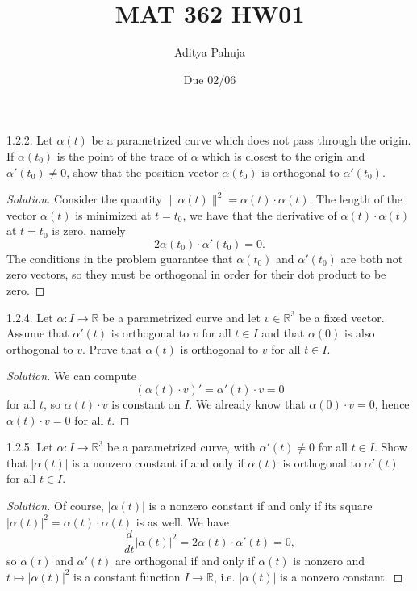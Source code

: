 \documentclass[11pt]{scrartcl}
\title{\vspace{-2em}MAT 362 HW01}
\author{\large Aditya Pahuja}
\date{\large Due 02/06}
\providecommand{\RR}{\mathbb R}
\newenvironment{soln}{\begin{proof}[Solution]}{\end{proof}}
\begin{document}
\maketitle

\begin{problem*}1.2.2.
	Let $\alpha(t)$ be a parametrized curve which
	does not pass through the origin. If $\alpha(t_0)$ is the point
	of the trace of $\alpha$ which is closest to the origin
	and $\alpha'(t_0)\ne 0$, show that
	the position vector $\alpha(t_0)$ is orthogonal to $\alpha'(t_0)$.
\end{problem*}

\begin{soln}
	Consider the quantity $\|\alpha(t)\|^2 = \alpha(t)\cdot\alpha(t)$.
	The length of the vector $\alpha(t)$ is minimized at $t=t_0$,
	we have that the derivative of $\alpha(t)\cdot\alpha(t)$
	at $t=t_0$ is zero, namely
	\[2\alpha(t_0)\cdot\alpha'(t_0) = 0.\]
	The conditions in the problem guarantee that $\alpha(t_0)$
	and $\alpha'(t_0)$ are both not zero vectors, so they must be orthogonal
	in order for their dot product to be zero.
\end{soln}

\begin{problem*}1.2.4.
	Let $\alpha\colon I\to\RR$ be a parametrized curve
	and let $v\in\RR^3$ be a fixed vector. Assume that $\alpha'(t)$
	is orthogonal to $v$ for all $t\in I$ and that $\alpha(0)$
	is also orthogonal to $v$. Prove that $\alpha(t)$ is orthogonal to $v$
	for all $t\in I$.
\end{problem*}

\begin{soln}
	We can compute
	\[(\alpha(t)\cdot v)' = \alpha'(t)\cdot v = 0\]
	for all $t$, so $\alpha(t)\cdot v$ is constant on $I$.
	We already know that $\alpha(0)\cdot v = 0$,
	hence $\alpha(t)\cdot v = 0$ for all $t$.
\end{soln}

\begin{problem*}1.2.5.
	Let $\alpha\colon I\to\RR^3$ be a parametrized curve,
	with $\alpha'(t)\ne 0$ for all $t\in I$. Show that
	$|\alpha(t)|$ is a nonzero constant if and only if
	$\alpha(t)$ is orthogonal to $\alpha'(t)$ for all $t\in I$.
\end{problem*}

\begin{soln}
	Of course, $|\alpha(t)|$ is a nonzero constant if and only if its square
	$|\alpha(t)|^2 = \alpha(t)\cdot\alpha(t)$ is as well. We have
	\[\frac{d}{dt}|\alpha(t)|^2 = 2\alpha(t)\cdot\alpha'(t) = 0,\]
	so $\alpha(t)$ and $\alpha'(t)$ are orthogonal if and only if
	$\alpha(t)$ is nonzero and $t\mapsto |\alpha(t)|^2$ is a constant function
	$I\to\RR$, i.e. $|\alpha(t)|$ is a nonzero constant.
\end{soln}
\end{document}
